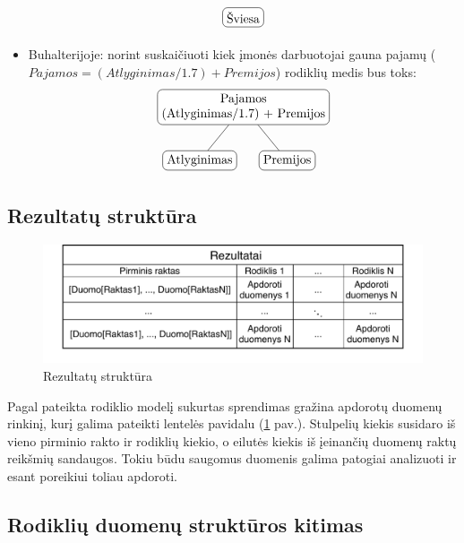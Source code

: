 \documentclass{VUMIFPSbakalaurinis}
\begin{document}
\begin{itemize}
\[\begin{tikzpicture}[sibling distance=7em, every node/.style = {shape=rectangle, rounded                                corners, draw, align=center,	
                                top color=white, bottom color=white}]
            \node{Šviesa};
        \end{tikzpicture} 	
    \]
    \item Buhalterijoje: norint suskaičiuoti kiek įmonės darbuotojai gauna pajamų (\(\textit{Pajamos} = (\textit{Atlyginimas}/1.7) + \textit{Premijos}\)) rodiklių medis bus toks: 
    \[	
        \begin{tikzpicture}[sibling distance=7em,	
            every node/.style = {shape=rectangle, rounded corners,	
                                 draw, align=center,	
                                 top color=white, bottom color=white}]	
            \node {Pajamos\\(Atlyginimas/1.7) + Premijos}	
                    child { node {Atlyginimas} }	
                    child { node {Premijos} } ;	
        \end{tikzpicture} 	
    \]
\end{itemize}  


\subsection{Rezultatų struktūra}

\begin{figure}[H]
    \centering
    \includegraphics[width=1\textwidth]{img/rezultatai.pdf}
    \caption{Rezultatų struktūra}
    \label{img:rezultatai}
\end{figure}

Pagal pateikta rodiklio modelį sukurtas sprendimas gražina apdorotų duomenų rinkinį, kurį galima pateikti lentelės pavidalu (\ref{img:rezultatai} pav.).  Stulpelių kiekis susidaro iš vieno pirminio rakto ir rodiklių kiekio, o eilutės kiekis iš įeinančių duomenų raktų reikšmių sandaugos. Tokiu būdu saugomus duomenis galima patogiai analizuoti ir esant poreikiui toliau apdoroti.


\subsection{Rodiklių duomenų struktūros kitimas}
\end{document}
